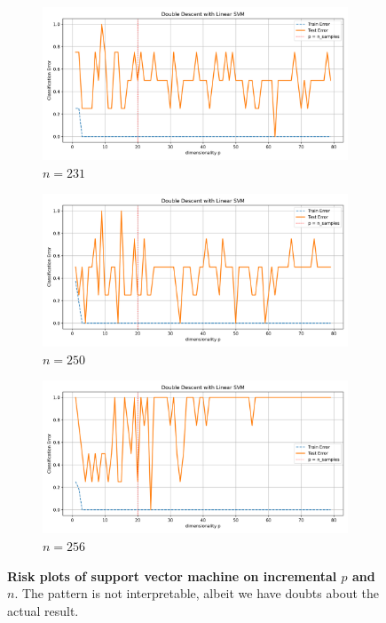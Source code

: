 \documentclass[twoside,10pt]{article}
\begin{document}
\begin{figure}[htb]
  \begin{subfigure}[b]{\imgwidth}
    \includegraphics[width=\linewidth]{img_qq/risk_curve_n150.png}
    \caption{$n=231$}\label{fig:2m1}
  \end{subfigure}%
  \hfill
  \begin{subfigure}[b]{\imgwidth}
    \includegraphics[width=\linewidth]{img_qq/risk_curve_n160.png}
    \caption{$n=250$}\label{fig:2n1}
  \end{subfigure}%
  \hfill
  \begin{subfigure}[b]{\imgwidth}
    \includegraphics[width=\linewidth]{img_qq/risk_curve_n170.png}
    \caption{$n=256$}\label{fig:2o1}
  \end{subfigure}%

  \caption{\textbf{Risk plots of support vector machine on incremental $p$ and $n$}. The pattern is not interpretable, albeit we have doubts about the actual result.}
  \label{fig:risk_all_grid_svm}
\end{figure}
\end{document}
